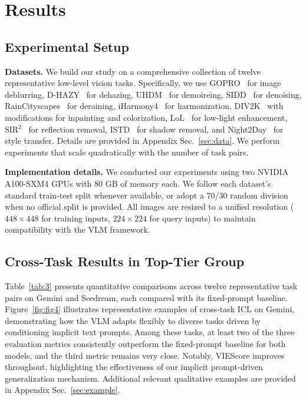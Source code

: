 \section{Results}
\label{sec:result}

\subsection{Experimental Setup}

\textbf{Datasets.}
We build our study on a comprehensive collection of twelve representative low-level vision tasks. Specifically, we use GOPRO~\cite{nah2017deep} for image deblurring, D-HAZY~\cite{ancuti2016d} for dehazing, UHDM~\cite{yu2022towards} for demoireing, SIDD~\cite{abdelhamed2018high, abdelhamed2020ntire} for denoising, RainCityscapes~\cite{hu2019depth} for deraining, iHarmony4~\cite{cong2019image} for harmonization, DIV2K~\cite{agustsson2017ntire} with modifications for inpainting and colorization, LoL~\cite{wei2018deep} for low-light enhancement, SIR$^2$~\cite{wan2022benchmarking} for reflection removal, ISTD~\cite{wang2018stacked} for shadow removal, and Night2Day~\cite{laffont2014transient} for style transfer. Details are provided in Appendix Sec.~\ref{sec:data}. We perform experiments that scale quadratically with the number of task pairs.

\noindent \textbf{Implementation details.} We conducted our experiments using two NVIDIA A100-SXM4 GPUs with 80 GB of memory each. We follow each dataset's standard train-test split whenever available, or adopt a 70/30 random division when no official split is provided. All images are resized to a unified resolution ($448 \times 448$ for training inputs, $224 \times 224$ for query inputs) to maintain compatibility with the VLM framework.

\subsection{Cross-Task Results in Top-Tier Group}
Table~\ref{tab:3} presents quantitative comparisons across twelve representative task pairs on Gemini and Seedream, each compared with its fixed-prompt baseline.
Figure~\ref{fig:fig4} illustrates representative examples of cross-task ICL on Gemini, demonstrating how the VLM adapts flexibly to diverse tasks driven by conditioning implicit text prompts. Among these tasks, at least two of the three evaluation metrics consistently outperform the fixed-prompt baseline for both models, and the third metric remains very close. Notably, VIEScore improves throughout, highlighting the effectiveness of our implicit prompt-driven generalization mechanism. Additional relevant qualitative examples are provided in Appendix Sec.~\ref{sec:example}.


